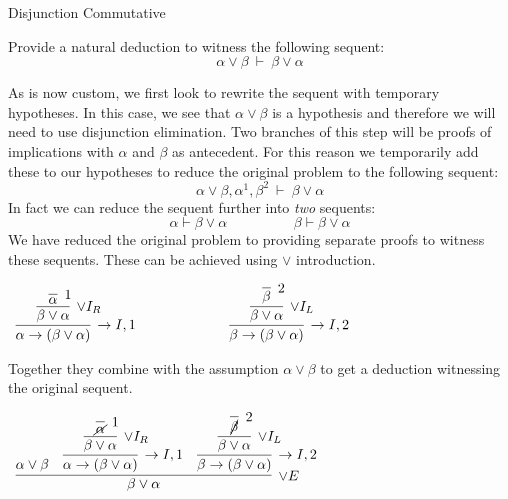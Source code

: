 \documentclass{book}
\begin{document}
    \begin{eg}{Disjunction Commutative}

        Provide a natural deduction to witness the following sequent: $$\alpha \lor \beta \ \vdash \ \beta \lor \alpha $$

        As is now custom, we first look to rewrite the sequent with temporary hypotheses. In this case, we see that $\alpha \lor \beta$ is a hypothesis and therefore we will need to use disjunction elimination. Two branches of this step will be proofs of implications with $\alpha$ and $\beta$ as antecedent. For this reason we temporarily add these to our hypotheses to reduce the original problem to the following sequent: $$\alpha \lor \beta, \alpha^{1}, \beta^{2} \ \vdash \ \beta \lor \alpha $$
        In fact we can reduce the sequent further into \emph{two} sequents: $$\alpha \vdash \beta \lor \alpha \hspace{2cm} \beta \vdash \beta \lor \alpha$$
        We have reduced the original problem to providing separate proofs to witness these sequents. These can be achieved using $\lor$ introduction. 

        \begin{center}
            $\begin{array}{c c}
                \infer[\to I,1]{\alpha \to (\beta \lor \alpha)}
                        {\infer[\lor I_{R}]{\beta \lor \alpha}
                            {\infer[1]{\alpha}
                                {}}}

                    \hspace{1cm}
                &
                    \hspace{1cm}

                \infer[\to I,2]{\beta \to (\beta \lor \alpha)}
                        {\infer[\lor I_{L}]{\beta \lor \alpha}
                            {\infer[2]{\beta}
                                {}}}
            \end{array}$
        \end{center}

        Together they combine with the assumption $\alpha \lor \beta$ to get a deduction witnessing the original sequent. 

        \begin{center}
            $\begin{array}{c}
                \infer[\lor E]{\beta \lor \alpha}
                    {\alpha \lor \beta
                    &
                    \infer[\to I,1]{\alpha \to (\beta \lor \alpha)}
                        {\infer[\lor I_{R}]{\beta \lor \alpha}
                            {\infer[1]{\cancel{\alpha}}
                                {}}}
                    &
                    \infer[\to I,2]{\beta \to (\beta \lor \alpha)}
                        {\infer[\lor I_{L}]{\beta \lor \alpha}
                            {\infer[2]{\cancel{\beta}}
                                {}}}}
            \end{array}$
        \end{center}

        
    \end{eg}
\end{document}

